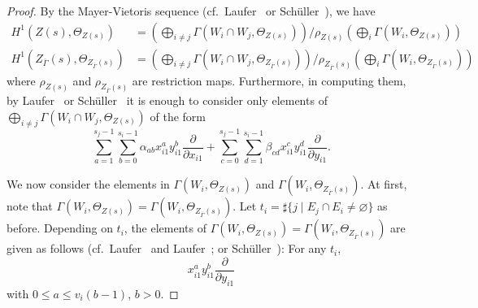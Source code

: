 \documentclass[a4paper, reqno, twoside]{amsart}
\theoremstyle{definition}
\numberwithin{equation}{section}
\begin{document}
\begin{proof}
By the Mayer-Vietoris sequence (cf.\  Laufer~\cite[(3.10)]{Laufer-1973}
or Sch\"uller~\cite[Lemma~3.4]{Schuller-2012}), we have
\begin{equation}\label{equation:matrix-rank}
\begin{aligned}
H^1(Z(s), \Theta_{Z(s)}) &= \left(\bigoplus_{i \neq j} \Gamma(W_i \cap
W_j, \Theta_{Z(s)})\right) / \rho_{Z(s)}\left(\bigoplus_{i}
\Gamma(W_i, \Theta_{Z(s)})\right) \\ H^1(Z_{\overline{\Gamma}}(s),
\Theta_{Z_{\overline{\Gamma}}(s)}) &= \left(\bigoplus_{i \neq j}
\Gamma(W_i \cap W_j, \Theta_{Z_{\overline{\Gamma}}(s)})\right) /
\rho_{Z_{\overline{\Gamma}}(s)}\left(\bigoplus_{i} \Gamma(W_i,
\Theta_{Z_{\overline{\Gamma}}(s)})\right)
\end{aligned}
\end{equation}
where $\rho_{Z(s)}$ and $\rho_{Z_{\overline{\Gamma}}(s)}$ are
restriction maps. Furthermore, in computing them, by
Laufer~\cite[(3.11)]{Laufer-1973} or
Sch\"uller~\cite[(4.16)]{Schuller-2012} it is enough to consider
only elements of $\bigoplus_{i \neq j} \Gamma(W_i \cap W_j, \Theta_{Z(s)})$
of the form
\begin{equation}\label{equation:matrix-row}
\sum_{a=1}^{s_j-1} \sum_{b=0}^{s_i-1} \alpha_{ab} x_{i1}^a y_{i1}^b
\frac{\partial}{\partial x_{i1}} + \sum_{c=0}^{s_j-1}
\sum_{d=1}^{s_i-1} \beta_{cd} x_{i1}^c y_{i1}^d
\frac{\partial}{\partial y_{i1}} .
\end{equation}

We now consider the elements in $\Gamma(W_i, \Theta_{Z(s)})$ and
$\Gamma(W_i, \Theta_{Z_{\overline{\Gamma}}(s)})$. At first, note that
$\Gamma(W_i, \Theta_{Z(s)}) = \Gamma(W_i,
\Theta_{Z_{\overline{\Gamma}}(s)})$. Let $t_i=\sharp \{j \mid E_j \cap
E_i \neq \varnothing \}$ as before. Depending on $t_i$, the elements
of $\Gamma(W_i, \Theta_{Z(s)}) = \Gamma(W_i,
\Theta_{Z_{\overline{\Gamma}}(s)})$ are given as follows
(cf.\  Laufer~\cite[pp.~86--87]{Laufer-1973} and
Laufer~\cite[(4.4)]{Laufer-1973-Taut}; or
Sch\"uller~\cite[p.~68]{Schuller-2012}): For any $t_i$,
\begin{equation}\label{equation:partial-y}
x_{i1}^a y_{i1}^b \frac{\partial}{\partial y_{i1}}
\end{equation}
with $0 \le a \le v_i(b-1)$, $b > 0$.


\end{proof}
\end{document}
